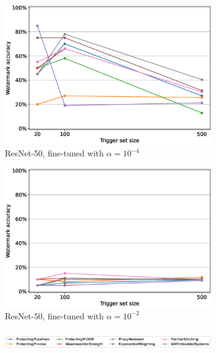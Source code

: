 \begin{figure}
\begin{subfigure}{0.41\linewidth}
        \includegraphics[width=\linewidth]{images/finetuning/resnet50_finetuning_per_arch_00001.eps}
        \caption{ResNet-50, fine-tuned with $\alpha=10^{-4}$}
        \label{fig:finetuning-smalllr-allmethods-perarch-resnet50}
    \end{subfigure}
    \quad
    \begin{subfigure}{0.41\linewidth}
        \includegraphics[width=\linewidth]{images/finetuning/resnet50_finetuning_per_arch_001.eps}
        \caption{ResNet-50, fine-tuned with $\alpha=10^{-2}$}
        \label{fig:finetuning-largelr-allmethods-perarch-resnet50}
    \end{subfigure}
    
    \begin{subfigure}{\linewidth}
    \centering
    \includegraphics[height=1cm]{images/finetuning/legend_finetuning_per_arch_colors.eps}
    \end{subfigure}
    

\end{figure}
